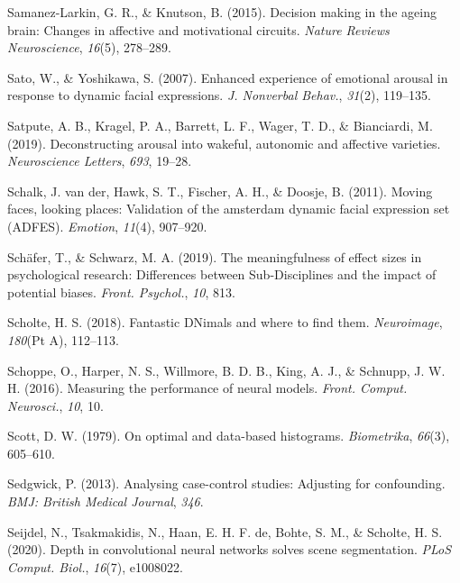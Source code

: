 \documentclass[11pt,american,a4paper,oneside,]{memoir} %
\begin{document}
\leavevmode\hypertarget{ref-samanez2015decision}{}%
Samanez-Larkin, G. R., \& Knutson, B. (2015). Decision making in the ageing brain: Changes in affective and motivational circuits. \emph{Nature Reviews Neuroscience}, \emph{16}(5), 278--289.

\leavevmode\hypertarget{ref-Sato2007-ah}{}%
Sato, W., \& Yoshikawa, S. (2007). Enhanced experience of emotional arousal in response to dynamic facial expressions. \emph{J. Nonverbal Behav.}, \emph{31}(2), 119--135.

\leavevmode\hypertarget{ref-satpute2019deconstructing}{}%
Satpute, A. B., Kragel, P. A., Barrett, L. F., Wager, T. D., \& Bianciardi, M. (2019). Deconstructing arousal into wakeful, autonomic and affective varieties. \emph{Neuroscience Letters}, \emph{693}, 19--28.

\leavevmode\hypertarget{ref-Van_der_Schalk2011-bq}{}%
Schalk, J. van der, Hawk, S. T., Fischer, A. H., \& Doosje, B. (2011). Moving faces, looking places: Validation of the amsterdam dynamic facial expression set (ADFES). \emph{Emotion}, \emph{11}(4), 907--920.

\leavevmode\hypertarget{ref-Schafer2019-ue}{}%
Schäfer, T., \& Schwarz, M. A. (2019). The meaningfulness of effect sizes in psychological research: Differences between Sub-Disciplines and the impact of potential biases. \emph{Front. Psychol.}, \emph{10}, 813.

\leavevmode\hypertarget{ref-Scholte2018-he}{}%
Scholte, H. S. (2018). Fantastic DNimals and where to find them. \emph{Neuroimage}, \emph{180}(Pt A), 112--113.

\leavevmode\hypertarget{ref-Schoppe2016-bu}{}%
Schoppe, O., Harper, N. S., Willmore, B. D. B., King, A. J., \& Schnupp, J. W. H. (2016). Measuring the performance of neural models. \emph{Front. Comput. Neurosci.}, \emph{10}, 10.

\leavevmode\hypertarget{ref-scott1979optimal}{}%
Scott, D. W. (1979). On optimal and data-based histograms. \emph{Biometrika}, \emph{66}(3), 605--610.

\leavevmode\hypertarget{ref-Sedgwick2013-op}{}%
Sedgwick, P. (2013). Analysing case-control studies: Adjusting for confounding. \emph{BMJ: British Medical Journal}, \emph{346}.

\leavevmode\hypertarget{ref-Seijdel2020-ff}{}%
Seijdel, N., Tsakmakidis, N., Haan, E. H. F. de, Bohte, S. M., \& Scholte, H. S. (2020). Depth in convolutional neural networks solves scene segmentation. \emph{PLoS Comput. Biol.}, \emph{16}(7), e1008022.
\end{document}
